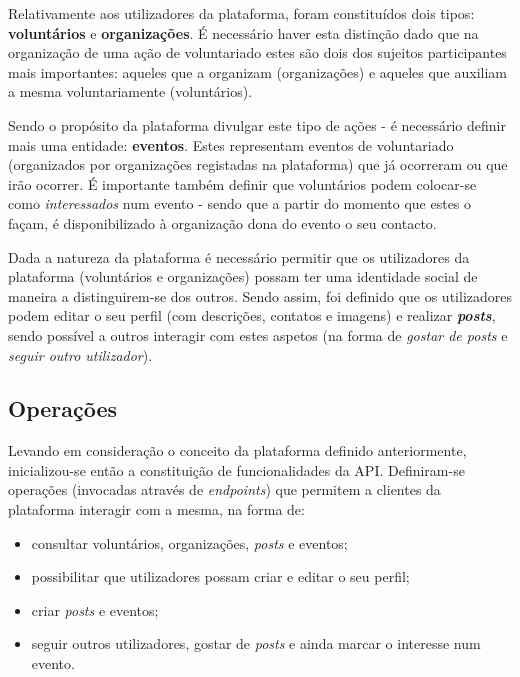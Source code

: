 \par \medskip

Relativamente aos utilizadores da plataforma, foram constituídos dois tipos: \textbf{voluntários} e \textbf{organizações}. É necessário haver esta distinção dado que na organização de uma ação de voluntariado estes são dois dos sujeitos participantes mais importantes: aqueles que a organizam (organizações) e aqueles que auxiliam a mesma voluntariamente (voluntários).

\par \medskip

Sendo o propósito da plataforma divulgar este tipo de ações - é necessário definir mais uma entidade: \textbf{eventos}. Estes representam eventos de voluntariado (organizados por organizações registadas na plataforma) que já ocorreram ou que irão ocorrer. É importante também definir que voluntários podem colocar-se como \textit{interessados} num evento - sendo que a partir do momento que estes o façam, é disponibilizado à organização dona do evento o seu contacto.

\par \medskip

Dada a natureza da plataforma é necessário permitir que os utilizadores da plataforma (voluntários e organizações) possam ter uma identidade social de maneira a distinguirem-se dos outros. Sendo assim, foi definido que os utilizadores podem editar o seu perfil (com descrições, contatos e imagens) e realizar \textit{\textbf{posts}}, sendo possível a outros interagir com estes aspetos (na forma de \textit{gostar de posts} e \textit{seguir outro utilizador}).
 
\subsection{Operações}

Levando em consideração o conceito da plataforma definido anteriormente, inicializou-se então a constituição de funcionalidades da API. Definiram-se operações (invocadas através de \textit{endpoints}) que permitem a clientes da plataforma interagir com a mesma, na forma de:

\begin{itemize}
	\item consultar voluntários, organizações, \textit{posts} e eventos;
	\item possibilitar que utilizadores possam criar e editar o seu perfil;
	\item criar \textit{posts} e eventos;
	\item seguir outros utilizadores, gostar de \textit{posts} e ainda marcar o interesse num evento.
\end{itemize}

